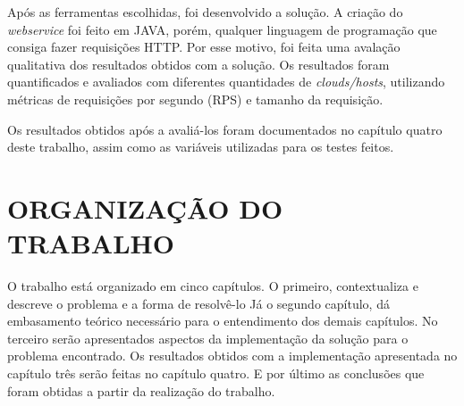 Após as ferramentas escolhidas, foi desenvolvido a solução. A criação do \textit{webservice} foi 
feito em JAVA, porém, qualquer linguagem de programação que consiga fazer requisições HTTP.
Por esse motivo, foi feita uma avalação qualitativa dos resultados obtidos com a solução.
Os resultados foram quantificados e avaliados com diferentes quantidades de \textit{clouds/hosts},
utilizando métricas de requisições por segundo (RPS) e tamanho da requisição.

Os resultados obtidos após a avaliá-los foram documentados no capítulo quatro
deste trabalho, assim como as variáveis utilizadas para os testes feitos.

\section{ORGANIZAÇÃO DO TRABALHO}
\label{sec:organizacaoTrabalho}

O trabalho está organizado em cinco capítulos. O primeiro, contextualiza e descreve o problema e a forma de resolvê-lo
Já o segundo capítulo, dá embasamento teórico necessário para o entendimento dos demais capítulos.
No terceiro serão apresentados aspectos da implementação da solução para o problema encontrado. 
Os resultados obtidos com a implementação apresentada no capítulo três serão feitas no capítulo quatro. 
E por último as conclusões que foram obtidas a partir da realização do trabalho.
